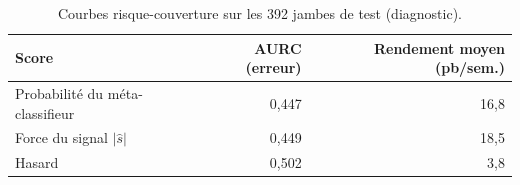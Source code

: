 \begin{table}[ht]
\centering
\small
\caption{Courbes risque-couverture sur les 392 jambes de test (diagnostic).}
\label{tab:aurc}
\begin{tabular}{lrr}
\toprule
Score & AURC (erreur) & Rendement moyen (pb/sem.) \\
\midrule
Probabilité du méta-classifieur & 0,447 & 16,8 \\
Force du signal $|\hat s|$ & 0,449 & 18,5 \\
Hasard & 0,502 & 3,8 \\
\bottomrule
\end{tabular}
\end{table}

